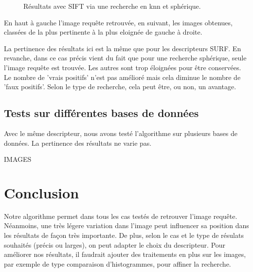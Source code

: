 \documentclass{article}
\begin{document}
\begin{figure}[!ht]%
  \centering
  \hspace{0.04\textwidth}
  \caption{Résultats avec SIFT via une recherche en knn et sphérique.}
  \label{desc}
\end{figure}

En haut à gauche l'image requête retrouvée, en suivant, les images obtenues, classées de la plus pertinente à la plus eloignée de gauche à droite.

La pertinence des résultats ici est la même que pour les descripteurs SURF. En revanche, dans ce cas précis vient du fait que pour une recherche sphérique, seule l'image requête est trouvée. Les autres sont trop éloignées pour être conservées. Le nombre de 'vrais positifs' n'est pas amélioré mais cela diminue le nombre de 'faux positifs'. Selon le type de recherche, cela peut être, ou non, un avantage.



\subsection{Tests sur différentes bases de données}

Avec le même descripteur, nous avons testé l'algorithme sur plusieurs bases de données. La pertinence des résultats ne varie pas.

IMAGES


\section{Conclusion}

Notre algorithme permet dans tous les cas testés de retrouver l'image requête. Néanmoins, une très légere variation dans l'image peut influencer sa position dans les résultats de façon très importante. 
De plus, selon le cas et le type de résulats souhaités (précis ou larges), on peut adapter le choix du descripteur.
Pour améliorer nos résultats, il faudrait ajouter des traitements en plus sur les images, par exemple de type comparaison d'histogrammes, pour affiner la recherche.
\end{document}
